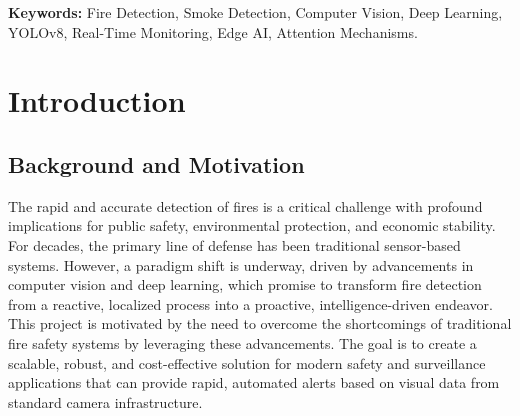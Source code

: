 \documentclass[12pt,a4paper]{article}
\begin{document}
\textbf{Keywords:} Fire Detection, Smoke Detection, Computer Vision, Deep Learning, YOLOv8, Real-Time Monitoring, Edge AI, Attention Mechanisms.

\clearpage
\tableofcontents
\clearpage

\section{Introduction}
\subsection{Background and Motivation}
The rapid and accurate detection of fires is a critical challenge with profound implications for public safety, environmental protection, and economic stability. For decades, the primary line of defense has been traditional sensor-based systems. However, a paradigm shift is underway, driven by advancements in computer vision and deep learning, which promise to transform fire detection from a reactive, localized process into a proactive, intelligence-driven endeavor. This project is motivated by the need to overcome the shortcomings of traditional fire safety systems by leveraging these advancements. The goal is to create a scalable, robust, and cost-effective solution for modern safety and surveillance applications that can provide rapid, automated alerts based on visual data from standard camera infrastructure.
\end{document}
